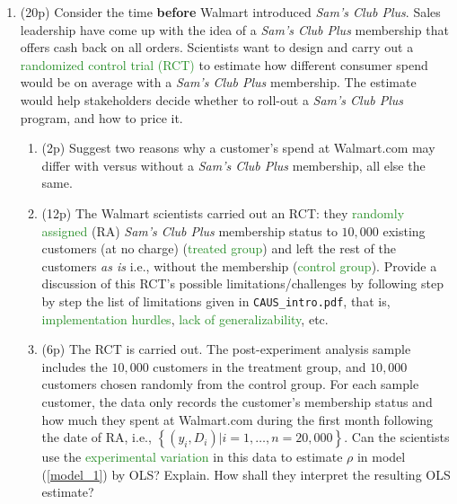 \documentclass{article}
\begin{document}
\begin{enumerate}[label=\textbf{Q\arabic{enumi}}.,ref=Q\arabic{enumi}, wide=0pt, itemsep=1em, topsep=5pt]
  
        \item (20p) Consider the time \textbf{before} Walmart introduced \textit{Sam's Club Plus}. Sales leadership have come up with the idea of a \textit{Sam's Club Plus} membership that offers cash back on all orders. Scientists want to design and carry out a \textcolor{ForestGreen}{randomized control trial (RCT)} to estimate how different consumer spend would be on average with a \textit{Sam's Club Plus} membership. The estimate would help stakeholders decide whether to roll-out a \textit{Sam's Club Plus} program, and how to price it. \label{item:q2}
        \begin{enumerate}
        
        \item (2p) Suggest two reasons why a customer's spend at Walmart.com may differ with versus without a \textit{Sam's Club Plus} membership, all else the same.
        
        \item (12p) The Walmart scientists carried out an RCT: they \textcolor{ForestGreen}{randomly assigned} (RA) \textit{Sam's Club Plus} membership status to $10,000$ existing customers (at no charge) (\textcolor{ForestGreen}{treated group}) and left the rest of the customers \textit{as is} i.e., without the membership (\textcolor{ForestGreen}{control group}). Provide a discussion of this RCT's possible limitations/challenges by following step by step the list of limitations given in \texttt{CAUS\_intro.pdf}, that is, \textcolor{ForestGreen}{implementation hurdles}, \textcolor{ForestGreen}{lack of generalizability}, etc.
        
        \item (6p) The RCT is carried out. The post-experiment analysis sample includes the $10,000$ customers in the treatment group, and $10,000$ customers chosen randomly from the control group. For each sample customer, the data only records the customer's membership status and how much they spent at Walmart.com during the first month following the date of RA, i.e., $\left\{ \left( y_{i},D_{i}\right) |i=1,\ldots,n=20,000\right\} $. Can the scientists use the \textcolor{ForestGreen}{experimental variation} in this data to estimate $\rho$ in model (\ref{model_1}) by OLS? Explain. How shall they interpret the resulting OLS estimate?
    \end{enumerate}

 

\end{enumerate}
\end{document}
